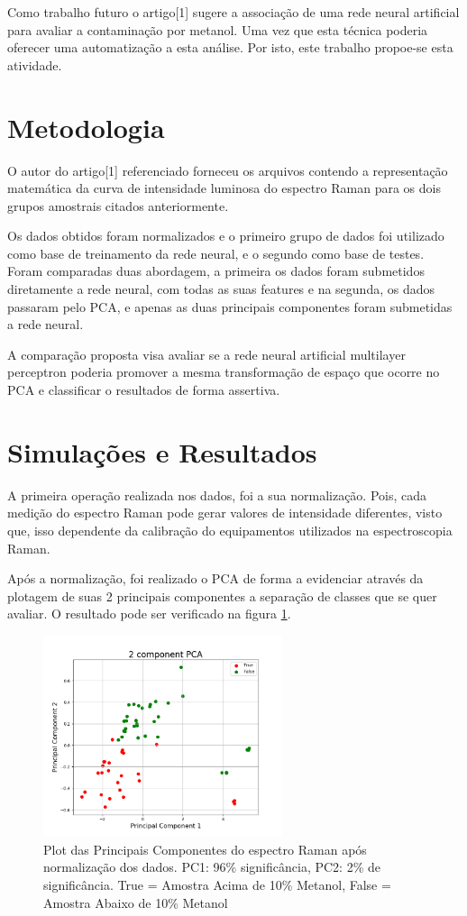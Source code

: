 \documentclass{article}
\begin{document}
Como trabalho futuro o artigo[1] sugere a associação de uma rede neural artificial para avaliar a contaminação por metanol. Uma vez que esta técnica poderia oferecer uma automatização a esta análise. Por isto, este trabalho propoe-se esta atividade.

\vspace{1cm}
\section{Metodologia}
\vspace{1cm} O autor do artigo[1] referenciado forneceu os arquivos contendo a representação matemática da curva de intensidade luminosa do espectro Raman para os dois grupos amostrais citados anteriormente.

Os dados obtidos foram normalizados e o primeiro grupo de dados foi utilizado como base de treinamento da rede neural, e o segundo como base de testes. Foram comparadas duas abordagem, a primeira os dados foram submetidos diretamente a rede neural, com todas as suas features e na segunda, os dados passaram pelo PCA, e apenas as duas principais componentes foram submetidas a rede neural.

A comparação proposta visa avaliar se a rede neural artificial multilayer perceptron poderia promover a mesma transformação de espaço que ocorre no PCA e classificar o resultados de forma assertiva.

\vspace{1cm}
\section{Simulações e Resultados}
\vspace{1cm} A primeira operação realizada nos dados, foi a sua normalização. Pois, cada medição do espectro Raman pode gerar valores de intensidade diferentes, visto que, isso dependente da calibração do equipamentos utilizados na espectroscopia Raman.

Após a normalização, foi realizado o PCA de forma a evidenciar através da plotagem de suas 2 principais componentes a separação de classes que se quer avaliar. O resultado pode ser verificado na figura \ref{pca}.

\begin{figure}[ht]
\centering
\includegraphics[width=7cm]{pca}
\caption{Plot das Principais Componentes do espectro Raman após normalização dos dados. PC1: 96\% significância, PC2: 2\% de significância. True = Amostra Acima de 10\% Metanol, False = Amostra Abaixo de 10\% Metanol}
\label{pca}
\end{figure}
\end{document}
